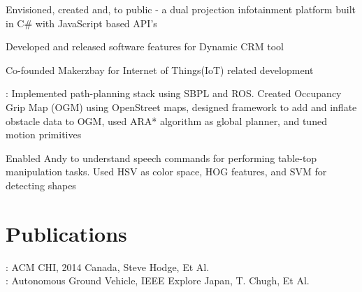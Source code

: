 \documentclass[]{resume-openfont}
\begin{document}
\begin{minipage}[t]{0.63\textwidth}
\begin{tightemize}
\end{tightemize}
\sectionsep

\begin{tightemize}
\item Envisioned, created and, \href{https://github.com/Microsoft/kinect-ripple}{} to public \href{https://www.youtube.com/watch?v=_0K4iZdMjLw}{} - a dual projection infotainment platform built in C\# with JavaScript based API's
\item Developed and released software features for Dynamic CRM tool 
\item Co-founded Makerzbay for Internet of Things(IoT) related development 
\end{tightemize}
\sectionsep

\begin{tightemize}
\item \href{https://mrsdprojects.ri.cmu.edu/2015teamb/media/fall-and-spring-videos/}{}: Implemented path-planning stack using SBPL and ROS. Created Occupancy Grip  Map (OGM) using OpenStreet maps, designed framework to add and inflate obstacle data to OGM, used ARA* algorithm as global planner, and tuned motion primitives
\item \href{http://www.tusharchugh.com/works/andy/}{} 
Enabled Andy to understand speech commands for performing table-top manipulation tasks. Used HSV as color space, HOG features, and SVM for detecting shapes
\end{tightemize}
\sectionsep


\section{Publications}
\href{http://research.microsoft.com/pubs/207114/2014-02-14\%20CHI\%20sticker\%20circuits.pdf}{}: ACM CHI, 2014 Canada, Steve Hodge, Et Al. \\
\href{http://ieeexplore.ieee.org/xpl/login.jsp?tp=&arnumber=5558532&url=http\%3A\%2F\%2Fieeexplore.ieee.org\%2Fxpls\%2Fabs_all.jsp\%3Farnumber\%3D5558532}{}: Autonomous Ground Vehicle, IEEE Explore Japan, T. Chugh, Et Al.



\end{minipage}
\end{document}
